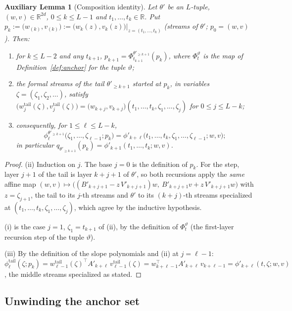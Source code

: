 \documentclass[11pt]{article}
\theoremstyle{definition}
\theoremstyle{remark}
\theoremstyle{plain}
\newtheorem{auxlemma}{Auxiliary Lemma}
\newcommand{\R}{\mathbb{R}}
\begin{document}
\begin{auxlemma}[Composition identity]\label{lem:comp}
Let $\theta'$ be an $L$-tuple, $(w,v)\in\R^{2d}$, $0\le k\le L-1$ and
$t_1,\dots,t_k\in\R$.  Put
$p_k:=\big(w_{(k)},v_{(k)}\big):=\big(w_k(z),v_k(z)\big)\big|_{z=(t_1,\dots,t_k)}$
(streams of $\theta'$; $p_0=(w,v)$).  Then:
\begin{enumerate}
\item[(i)] for $k\le L-2$ and any $t_{k+1}$,
$p_{k+1}=\Phi^{\theta'_{\ge k+1}}_{t_{k+1}}(p_k)$, where $\Phi^\vartheta_t$ is the map
of Definition~\ref{def:anchor} for the tuple $\vartheta$;
\item[(ii)] the formal streams of the tail $\theta'_{\ge k+1}$ started at $p_k$, in
variables $\zeta=(\zeta_1,\zeta_2,\dots)$, satisfy
$\big(w^{\mathrm{tail}}_j(\zeta),v^{\mathrm{tail}}_j(\zeta)\big)
=\big(w_{k+j},v_{k+j}\big)(t_1,\dots,t_k,\zeta_1,\dots,\zeta_j)$ for
$0\le j\le L-k$;
\item[(iii)] consequently, for $1\le\ell\le L-k$,
\[
\phi^{\theta'_{\ge k+1}}_\ell\big(\zeta_1,\dots,\zeta_{\ell-1};p_k\big)
=\phi'_{k+\ell}\big(t_1,\dots,t_k,\zeta_1,\dots,\zeta_{\ell-1};w,v\big);
\]
in particular $q_{\theta'_{\ge k+1}}(p_k)=\phi'_{k+1}(t_1,\dots,t_k;w,v)$.
\end{enumerate}
\end{auxlemma}

\begin{proof}
(ii)  Induction on $j$.  The base $j=0$ is the definition of $p_k$.  For the step,
layer $j+1$ of the tail is layer $k+j+1$ of $\theta'$, so both recursions apply the
\emph{same} affine map
$(w,v)\mapsto\big((B'_{k+j+1}-z\,V'_{k+j+1})w,\ B'_{k+j+1}v+z\,V'_{k+j+1}w\big)$ with
$z=\zeta_{j+1}$, the tail to its $j$-th streams and $\theta'$ to its $(k+j)$-th streams
specialized at $(t_1,\dots,t_k,\zeta_1,\dots,\zeta_j)$, which agree by the inductive
hypothesis.

(i)  is the case $j=1$, $\zeta_1=t_{k+1}$ of (ii), by the definition of
$\Phi^\vartheta_t$ (the first-layer recursion step of the tuple $\vartheta$).

(iii)  By the definition of the slope polynomials and (ii) at $j=\ell-1$:
$\phi^{\mathrm{tail}}_\ell(\zeta;p_k)
=w^{\mathrm{tail}}_{\ell-1}(\zeta)^\top A'_{k+\ell}\,v^{\mathrm{tail}}_{\ell-1}(\zeta)
=w_{k+\ell-1}^\top A'_{k+\ell}\,v_{k+\ell-1}
=\phi'_{k+\ell}(t,\zeta;w,v)$, the middle streams specialized as stated.
\end{proof}

\subsection{Unwinding the anchor set}
\end{document}
